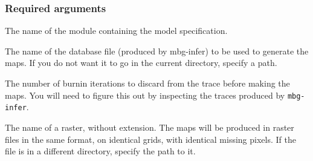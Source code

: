 \subsubsection{Required arguments%
}
\setcounter{listcnt0}{0}
\begin{list}{.}
{
\setlength{\rightmargin}{\leftmargin}
}

\item The name of the module containing the model specification.

\item The name of the database file (produced by mbg-infer) to be used to generate the
maps. If you do not want it to go in the current directory, specify a path.

\item The number of burnin iterations to discard from the trace before making the maps.
You will need to figure this out by inspecting the traces produced by \texttt{mbg-infer}.

\item The name of a raster, without extension. The maps will be produced in raster files
in the same format, on identical grids, with identical missing pixels. If the file
is in a different directory, specify the path to it.
\end{list}




